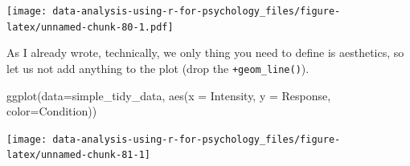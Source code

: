 \documentclass[
]{book}
\newenvironment{Shaded}{\begin{snugshade}}{\end{snugshade}}
\newcommand{\AttributeTok}[1]{\textcolor[rgb]{0.77,0.63,0.00}{#1}}
\newcommand{\FunctionTok}[1]{\textcolor[rgb]{0.00,0.00,0.00}{#1}}
\newcommand{\NormalTok}[1]{#1}
\begin{document}
\texttt{[image: data-analysis-using-r-for-psychology\_files/figure-latex/unnamed-chunk-80-1.pdf]}

As I already wrote, technically, we only thing you need to define is aesthetics, so let us not add anything to the plot (drop the \texttt{+geom\_line()}).

\begin{Shaded}
\begin{Highlighting}[]
\FunctionTok{ggplot}\NormalTok{(}\AttributeTok{data=}\NormalTok{simple\_tidy\_data, }\FunctionTok{aes}\NormalTok{(}\AttributeTok{x =}\NormalTok{ Intensity, }\AttributeTok{y =}\NormalTok{ Response, }\AttributeTok{color=}\NormalTok{Condition))}
\end{Highlighting}
\end{Shaded}

\begin{center}\texttt{[image: data-analysis-using-r-for-psychology\_files/figure-latex/unnamed-chunk-81-1]} \end{center}
\end{document}

